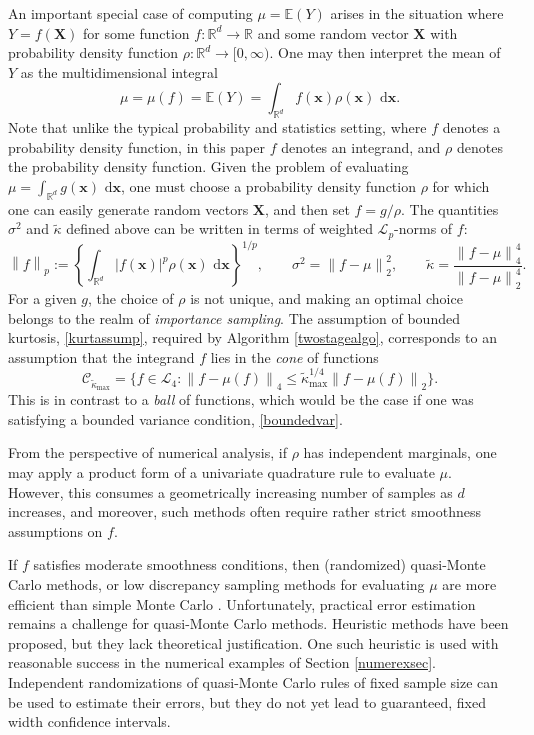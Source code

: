 \documentclass[graybox]{svmult}
\newcommand\reals{\mathbb{R}}
\newcommand\e{\mathbb{E}}
\newcommand{\vx}{\boldsymbol{x}}
\newcommand{\vX}{\boldsymbol{X}}
\newcommand{\rd}{\,\mathrm{d}}
\newcommand{\abs}[1]{\left|#1\right|}
\newcommand{\dif}{\rd}
\newcommand{\tkappa}{\tilde{\kappa}}
\newcommand{\cc}{\mathcal{C}}
\newcommand{\cl}{\mathcal{L}}
\def\abs#1{\ensuremath{\left \lvert #1 \right \rvert}}
\newcommand{\norm}[2][{}]{\ensuremath{\left \lVert #2 \right \rVert}_{#1}}
\begin{document}
An important special case of computing $\mu=\e(Y)$ arises in the situation where $Y=f(\vX)$ for some function $f: \reals^d \to \reals$ and some random vector $\vX$ with probability density function $\rho: \reals^d \to [0,\infty)$.  One may then interpret the mean of $Y$ as the multidimensional integral 
\begin{equation} \label{muintegral}
\mu=\mu(f)=\e(Y) = \int_{\reals^d} f(\vx) \rho(\vx) \, \dif \vx.
\end{equation}
Note that unlike the typical probability and statistics setting, where $f$ denotes a probability density function, in this paper $f$ denotes an integrand, and $\rho$ denotes the probability density function.
Given the problem of evaluating $\mu=\int_{\reals^d} g(\vx) \, \dif \vx$, one must choose a probability density function $\rho$ for which one can easily generate random vectors $\vX$, and then set $f = g/\rho$.  The quantities $\sigma^2$ and $\tkappa$ defined above can be written in terms of weighted $\cl_p$-norms of $f$:
\begin{equation} \label{Lpnormdef}
\norm[p]{f} :=\left\{\int_{\reals^d} \abs{f(\vx)}^p \rho(\vx) \, \dif \vx\right\}^{1/p}, \qquad
\sigma^2 = \norm[2]{f-\mu}^2, \qquad \tkappa = \frac{\norm[4]{f-\mu}^4}{\norm[2]{f-\mu}^4}.
\end{equation}
For a given $g$, the choice of $\rho$ is not unique, and making an optimal choice belongs to the realm of \emph{importance sampling}. The assumption of bounded kurtosis, \eqref{kurtassump}, required by Algorithm \ref{twostagealgo}, corresponds to an assumption that the integrand $f$ lies in the \emph{cone} of functions
\begin{equation} \label{conedef}
\cc_{\tkappa_{\max}} = \{ f \in \cl_4 : \norm[4]{f-\mu(f)} \le \tkappa_{\max}^{1/4} \norm[2]{f-\mu(f)} \}.
\end{equation}
This is in contrast to a \emph{ball} of functions, which would be the case if one was satisfying a bounded variance condition, \eqref{boundedvar}.

From the perspective of numerical analysis, if $\rho$ has independent marginals, one may apply a product form of a univariate quadrature rule to evaluate $\mu$.  However, this consumes a geometrically increasing number of samples as $d$ increases, and moreover, such methods often require rather strict smoothness assumptions on $f$.  

If $f$ satisfies moderate smoothness conditions, then (randomized) quasi-Monte Carlo methods, or low discrepancy sampling methods for evaluating $\mu$ are more efficient than simple Monte Carlo \citep{Nie92,SloJoe94,Lem09a,DicPil10a}.  
Unfortunately, practical error estimation remains a challenge for quasi-Monte Carlo methods.  Heuristic methods have been proposed, but they lack theoretical justification. One such heuristic is used with reasonable success in the numerical examples of Section \ref{numerexsec}.  Independent randomizations of quasi-Monte Carlo rules of fixed sample size can be used to estimate their errors, but they do not yet lead to guaranteed, fixed width confidence intervals.
\end{document}
